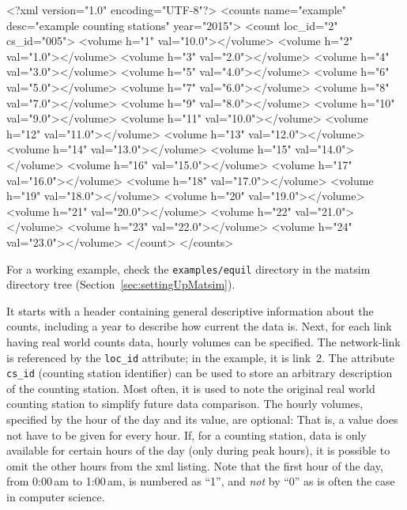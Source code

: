 \begin{xml}
<?xml version="1.0" encoding="UTF-8"?> 
<counts name="example" desc="example counting stations" year="2015"> 
   <count loc_id="2" cs_id="005"> 
      <volume h="1" val="10.0"></volume> 
      <volume h="2" val="1.0"></volume> 
      <volume h="3" val="2.0"></volume> 
      <volume h="4" val="3.0"></volume> 
      <volume h="5" val="4.0"></volume> 
      <volume h="6" val="5.0"></volume> 
      <volume h="7" val="6.0"></volume> 
      <volume h="8" val="7.0"></volume> 
      <volume h="9" val="8.0"></volume> 
      <volume h="10" val="9.0"></volume> 
      <volume h="11" val="10.0"></volume> 
      <volume h="12" val="11.0"></volume> 
      <volume h="13" val="12.0"></volume> 
      <volume h="14" val="13.0"></volume> 
      <volume h="15" val="14.0"></volume> 
      <volume h="16" val="15.0"></volume> 
      <volume h="17" val="16.0"></volume> 
      <volume h="18" val="17.0"></volume> 
      <volume h="19" val="18.0"></volume> 
      <volume h="20" val="19.0"></volume> 
      <volume h="21" val="20.0"></volume> 
      <volume h="22" val="21.0"></volume> 
      <volume h="23" val="22.0"></volume> 
      <volume h="24" val="23.0"></volume> 
   </count> 
</counts>
\end{xml}
For a working example, check the \lstinline{examples/equil} directory in the \gls{matsim} directory tree (\cf Section~\ref{sec:settingUpMatsim}).  

It starts with a header containing general descriptive information about the counts, including a year to describe how current the data is. Next, for each link having real world counts data, hourly volumes can be specified. The network-link is referenced by the \lstinline|loc_id| attribute; in the example, it is link~2. The attribute \lstinline|cs_id| (counting station identifier) can be used to store an arbitrary description of the counting station. Most often, it is used to note the original real world 
counting station to simplify future data comparison. The hourly volumes, specified by the hour of the day and its value, are optional: That is, a value does not have to be given for every hour. If, for a counting station, data is only available for certain hours of the day (\eg only during peak hours), it is possible to omit the other hours from the \gls{xml} listing. Note that the first hour of the day, from 0:00\,am to 1:00\,am, is numbered as ``1'', and \emph{not} by ``0'' as is often the case in computer science.

